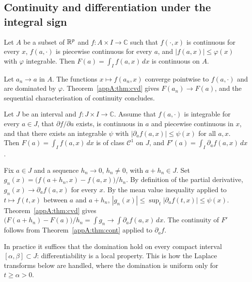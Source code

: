 \subsection{Continuity and differentiation under the integral sign}

\begin{theorem}\label{appA:thm:cont}
Let $A$ be a subset of $\mathbb{R}^p$ and $f:A\times I\to\mathbb{C}$ such that $f(\cdot,x)$ is continuous for every $x$, $f(a,\cdot)$
is piecewise continuous for every $a$, and $|f(a,x)|\le\varphi(x)$ with $\varphi$ integrable. Then
$F(a)=\int_If(a,x)\,dx$ is continuous on $A$.
\end{theorem}

\begin{humanproof}
Let $a_n\to a$ in $A$. The functions $x\mapsto f(a_n,x)$ converge pointwise to $f(a,\cdot)$ and are dominated by
$\varphi$. Theorem~\ref{appA:thm:cvd} gives $F(a_n)\to F(a)$, and the sequential characterisation of continuity
concludes.
\end{humanproof}

\begin{theorem}\label{appA:thm:deriv}
Let $J$ be an interval and $f:J\times I\to\mathbb{C}$. Assume that $f(a,\cdot)$ is integrable for every $a\in J$, that
$\partial f/\partial a$ exists, is continuous in $a$ and piecewise continuous in $x$, and that there exists an integrable
$\psi$ with $|\partial_af(a,x)|\le\psi(x)$ for all $a,x$. Then $F(a)=\int_If(a,x)\,dx$ is of class $\mathcal C^1$ on $J$,
and $F'(a)=\int_I\partial_af(a,x)\,dx$.
\end{theorem}

\begin{humanproof}
Fix $a\in J$ and a sequence $h_n\to0$, $h_n\ne0$, with $a+h_n\in J$. Set
$g_n(x)=\bigl(f(a+h_n,x)-f(a,x)\bigr)/h_n$. By definition of the partial derivative, $g_n(x)\to\partial_af(a,x)$ for
every $x$. By the mean value inequality applied to $t\mapsto f(t,x)$ between $a$ and $a+h_n$,
$|g_n(x)|\le\sup_t|\partial_af(t,x)|\le\psi(x)$. Theorem~\ref{appA:thm:cvd} gives
$\bigl(F(a+h_n)-F(a)\bigr)/h_n=\int g_n\to\int\partial_af(a,x)\,dx$. The continuity of $F'$ follows from
Theorem~\ref{appA:thm:cont} applied to $\partial_af$.
\end{humanproof}

\begin{remark}
In practice it suffices that the domination hold on every compact interval $[\alpha,\beta]\subset J$: differentiability
is a local property. This is how the Laplace transforms below are handled, where the domination is uniform only
for $t\ge\alpha>0$.
\end{remark}


